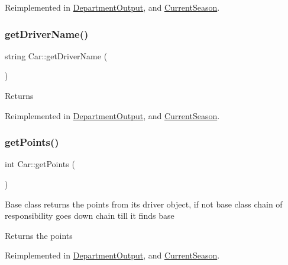 Reimplemented in \hyperlink{classDepartmentOutput_aca95508fd9145baea4e7a32448fa653b}{Department\+Output}, and \hyperlink{classCurrentSeason_a9ea661b3a870ecb22026d9a3c7343a8f}{Current\+Season}.

\mbox{\label{classCar_a0192991111c42f7cba809cc9831cd5f3}} 
\subsubsection{\texorpdfstring{get\+Driver\+Name()}{getDriverName()}}
{\footnotesize\ttfamily string Car\+::get\+Driver\+Name (\begin{DoxyParamCaption}{ }\end{DoxyParamCaption})\hspace{0.3cm}{\ttfamily [virtual]}}

\begin{DoxyReturn}{Returns}

\end{DoxyReturn}


Reimplemented in \hyperlink{classDepartmentOutput_a5c2bbaa1979ecbbd06629440884966a0}{Department\+Output}, and \hyperlink{classCurrentSeason_a3b8912ef6e838fe0a4d735ffc4cd7b66}{Current\+Season}.

\mbox{\label{classCar_a0e0b71dc2b09be094ffb08e5b73c8ea2}} 
\subsubsection{\texorpdfstring{get\+Points()}{getPoints()}}
{\footnotesize\ttfamily int Car\+::get\+Points (\begin{DoxyParamCaption}{ }\end{DoxyParamCaption})\hspace{0.3cm}{\ttfamily [virtual]}}

Base class returns the points from its driver object, if not base class chain of responsibility goes down chain till it finds base \begin{DoxyReturn}{Returns}
the points 
\end{DoxyReturn}


Reimplemented in \hyperlink{classDepartmentOutput_ac1eac849b183dd78906a5b2a7217b8ef}{Department\+Output}, and \hyperlink{classCurrentSeason_acea90ff7b0349785b189199d76b9a9a0}{Current\+Season}.


